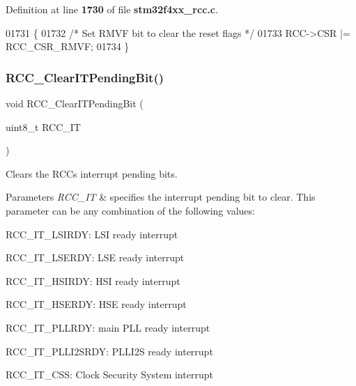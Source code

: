 Definition at line \textbf{ 1730} of file \textbf{ stm32f4xx\+\_\+rcc.\+c}.


\begin{DoxyCode}
01731 \{
01732   \textcolor{comment}{/* Set RMVF bit to clear the reset flags */}
01733   RCC->CSR |= RCC_CSR_RMVF;
01734 \}
\end{DoxyCode}
\mbox{\label{group__RCC__Group4_ga529842d165910f8f87e26115da36089b}} 
\subsubsection{R\+C\+C\+\_\+\+Clear\+I\+T\+Pending\+Bit()}
{\footnotesize\ttfamily void R\+C\+C\+\_\+\+Clear\+I\+T\+Pending\+Bit (\begin{DoxyParamCaption}\item[{uint8\+\_\+t}]{R\+C\+C\+\_\+\+IT }\end{DoxyParamCaption})}



Clears the R\+CC\textquotesingle{}s interrupt pending bits. 


\begin{DoxyParams}{Parameters}
{\em R\+C\+C\+\_\+\+IT} & specifies the interrupt pending bit to clear. This parameter can be any combination of the following values\+: \begin{DoxyItemize}
\item R\+C\+C\+\_\+\+I\+T\+\_\+\+L\+S\+I\+R\+DY\+: L\+SI ready interrupt \item R\+C\+C\+\_\+\+I\+T\+\_\+\+L\+S\+E\+R\+DY\+: L\+SE ready interrupt \item R\+C\+C\+\_\+\+I\+T\+\_\+\+H\+S\+I\+R\+DY\+: H\+SI ready interrupt \item R\+C\+C\+\_\+\+I\+T\+\_\+\+H\+S\+E\+R\+DY\+: H\+SE ready interrupt \item R\+C\+C\+\_\+\+I\+T\+\_\+\+P\+L\+L\+R\+DY\+: main P\+LL ready interrupt \item R\+C\+C\+\_\+\+I\+T\+\_\+\+P\+L\+L\+I2\+S\+R\+DY\+: P\+L\+L\+I2S ready interrupt \item R\+C\+C\+\_\+\+I\+T\+\_\+\+C\+SS\+: Clock Security System interrupt \end{DoxyItemize}
\\
\hline
\end{DoxyParams}

